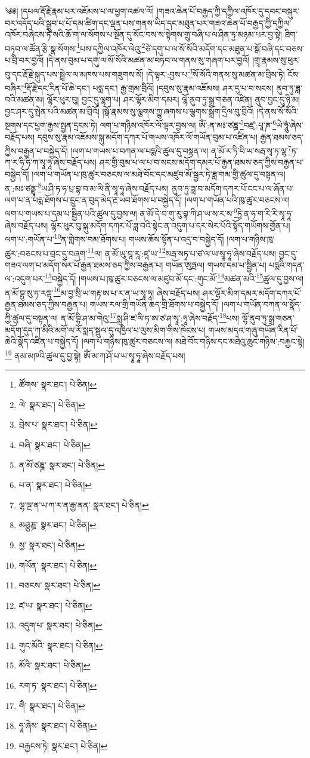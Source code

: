 \setcounter{footnote}{0} 
༄༅། །དཔལ་རྡོ་རྗེ་རྣམ་པར་འཇོམས་པ་ལ་ཕྱག་འཚལ་ལོ། །གཟའ་ཆེན་པོ་བརྒྱད་ཀྱི་དཀྱིལ་འཁོར་དུ་དབང་བསྐུར་བར་འདོད་པའི་སྒྲུབ་པ་པོ་དམ་ཚིག་དང་ལྡན་པས་གནས་ཡིད་དང་མཐུན་པར་གཟའ་ཆེན་པོ་བརྒྱད་ཀྱི་དཀྱིལ་འཁོར་བཞེངས་ཏེ་སའི་ཆོ་ག་ལ་སོགས་པ་སྔོན་དུ་སོང་བས་ས་སྟེགས་གྲུ་བཞི་པ་ལ་ཤིན་ཏུ་མཉམ་པར་བྱ་སྟེ། ཐིག་བཏབ་ལ་ཚོན་རྩི་སྣ་སོགས་\footnote{ཚོགས་  སྣར་ཐང་།  པེ་ཅིན། }པས་དཀྱིལ་འཁོར་ལེའུ་\footnote{ལེ་  སྣར་ཐང་།  པེ་ཅིན། }ཙེ་དགུ་པ་ལ་སོ་སོའི་མདོག་དང་མཐུན་པ་སྒོ་བཞི་དང་བཅས་པ་བྲི་བར་བྱའོ། །དེ་ནས་བུམ་པ་དགུ་ལ་སོ་སོའི་མཚན་མ་བཏབ་ལ་གནས་སུ་གཞག་པར་བྱའོ། །གྲྭ་རྣམས་སུ་ཕུར་བུ་དང་རྡོ་རྗེ་སྐུད་པས་སྦྲེལ་ལ་མཁས་པས་གཟུགས་སོ། །དེ་ལྟར་:བྱས་པ་\footnote{བྲེས་པ་  སྣར་ཐང་།  པེ་ཅིན། }སོ་སོའི་གནས་སུ་མཚན་མ་བྲིས་ཏེ། ངོས་བཞིར་\footnote{བཞི་  སྣར་ཐང་།  པེ་ཅིན། }རྡོ་རྗེ་དང་རིན་པོ་ཆེ་དང་། པདྨ་དང་། རྒྱ་གྲམ་བྲིའོ། །དབུས་སུ་རྣམ་འཇོམས། ཤར་དུ་པ་བ་སངས། ནུབ་ཏུ་ཟླ་བའི་མཚན་མ། ལྷོར་ཕུར་བུ། བྱང་དུ་ལྷག་པ། ཤར་ལྷོར་མིག་དམར། ལྷོ་ནུབ་ཏུ་སྒྲ་གཅན་འཛིན། ནུབ་བྱང་དུ་ཉི་མ། བྱང་ཤར་དུ་སྤེན་པའི་མཚན་མ་བྲིའོ། །སྒོ་རྣམས་སུ་ལྕགས་ཀྱུ་ཞགས་པ་ལྕགས་སྒྲོག་དྲིལ་བུ་བྲིའོ། །དེ་ནས་སོ་སོའི་སྔགས་དང་ཕྱག་རྒྱས་སྤྱན་དྲངས་ཏེ། ལག་པ་གཉིས་འཁོར་ལོ་ལྟར་བྱས་ལ། ཨོཾ་:ན་མཿ་ཙཎྜ་\footnote{ན་མོ་ཙཎྜ་  སྣར་ཐང་།  པེ་ཅིན། }བཛྲ་:པཱ་ཎ་\footnote{པ་ན་  སྣར་ཐང་།  པེ་ཅིན། }ཡེ་ཧཱུཾ་ཞེས་བརྗོད་པས། དབུས་སུ་རྣམ་འཇོམས་སྐུ་མདོག་དཀར་པོ་གཡས་འཁོར་ལོ་གཡོན་བུམ་པ་འཛིན་པ། རྒྱན་ཐམས་ཅད་ཀྱིས་བརྒྱན་པ་བསྐྱེད་དོ། །ལག་པ་གཡས་པ་བཀན་ལ་པདྨའི་ཚུལ་དུ་བསྟན་ལ། ན་མོ་ར་ཏི་བི་ཡ་སརྦ་སྭ་ཏ་ལྷ་\footnote{ལྷ་ལྔ་ན་ཡ་ཀ་ར་ན་རྒྱ་ནན་  སྣར་ཐང་།  པེ་ཅིན། }ཏ་ཀ་ར་ཧི་ཧི་ཀ་སྭཱ་ཧཱ་ཞེས་བརྗོད་པས། ཤར་གྱི་བུམ་པ་ལ་པ་བ་སངས་མདོག་དམར་པོ་རྒྱན་ཐམས་ཅད་ཀྱིས་བརྒྱན་པ་བསྐྱེད་དོ། །ལག་པ་གཡོན་པ་ཁུ་ཚུར་བཅངས་ལ་མཐེ་བོང་དང་མཛུབ་མོ་སྦྱར་ཏེ་ཟླ་གམ་གྱི་ཚུལ་དུ་བསྟན་ལ། ན་:མཿ་ཙནྡྲཱ་\footnote{མཤྩཎྜ་  སྣར་ཐང་།  པེ་ཅིན། }ཡ་ཤི་ཏ་ཧ་པྲ་བྷ་བ་མ་ལི་ནི་སྭཱ་ཧཱ་ཞེས་བརྗོད་པས། ནུབ་ཏུ་ཟླ་བ་མདོག་དཀར་པོ་ངང་པ་ལ་ཞོན་པ་ལག་པ་ན་པདྨ་ཐོགས་པ་དྲུང་ན་བུད་མེད་རྔ་ཡབ་ཐོགས་པ་བསྐྱེད་དོ། །ལག་པ་གཡོན་པའི་ཁུ་ཚུར་བཅངས་ལ། ལག་པ་གཡས་པ་དམ་པ་སྦྱིན་པའི་ཚུལ་དུ་བྱས་ལ། ན་མོ་དེ་བ་གུ་རུ་བྷ་ཀི་ཤ་ཡ་ས་ར་ས་\footnote{སྱ་  སྣར་ཐང་།  པེ་ཅིན། }ཏྱེ་ན་ཧ་ག་རི་རི་སྭཱ་ཧཱ་ཞེས་བརྗོད་པས། ལྷོར་ཕུར་བུ་སྐུ་མདོག་དཀར་པོ་ཟླ་བའི་སྟེང་ན་འདུག་པ་དར་སེར་པོའི་སྟོད་གཡོགས་གྱོན་པ། ལག་པ་:གཡོན་པ་\footnote{གཡོན་  སྣར་ཐང་།  པེ་ཅིན། }ན་གླེགས་བམ་ཐོགས་པ། གཡས་ཆོས་སྟོན་པ་འདྲ་བ་བསྐྱེད་དོ། །ལག་པ་གཉིས་ཁུ་ཚུར་:བཅངས་པ་བྲང་དུ་བཞག་\footnote{བཅངས་  སྣར་ཐང་།  པེ་ཅིན། }ལ། ན་མོ་ཡུ་བཱ་རཱ་:ཛཱ་ཡ་\footnote{ཛ་ཡ་  སྣར་ཐང་།  པེ་ཅིན། }སརྦ་སཏྭ་པ་ཙ་ལ་ཡ་སྭཱ་ཧཱ་ཞེས་བརྗོད་པས། བྱང་དུ་གཟའ་ལག་པ་མདོག་སེར་པོ་རྒྱན་ཐམས་ཅད་ཀྱིས་བརྒྱན་པ། གཡོན་ཨུཏྤལ། གཡས་དམ་པ་སྦྱིན་པ། པདྨའི་གདན་ལ་:འདུག་པར་\footnote{འདུག་པ་  སྣར་ཐང་།  པེ་ཅིན། }བསྐྱེད་དོ། །གཡས་པ་ཁུ་ཚུར་བཅངས་ལ་མཛུབ་མོ་དང་:གུང་མོ་\footnote{གུང་མོའི་  སྣར་ཐང་།  པེ་ཅིན། }མཚན་མའི་\footnote{མོའི་  སྣར་ཐང་།  པེ་ཅིན། }ཚུལ་དུ་བྱས་ལ། ན་མོ་བྷུ་སུ་ཏ་རཀྟ་\footnote{རག་ཏ་  སྣར་ཐང་།  པེ་ཅིན། }མ་བྱ་སྲི་ཡ་གརྟ་ཨ་པ་ར་ན་ཡ་སྭཱ་ཧཱ། ཞེས་བརྗོད་པས། ཤར་ལྷོར་མིག་དམར་མདོག་དཀར་པོ་རྒྱན་ཐམས་ཅད་ཀྱིས་བརྒྱན་པ། གཡས་རལ་གྲི་གཡོན་ཆད་གྲི་ཐོགས་པ་བསྐྱེད་དོ། །ལག་པ་གཡོན་བཀན་ལ་སྣོད་ཀྱི་ཚུལ་དུ་བསྟན་ལ། ན་མོ་བྷི་ཤ་མ་གེའུ་\footnote{གཻ་  སྣར་ཐང་།  པེ་ཅིན། }སྨྲ་ཤི་ཛ་ལི་ཏ་ཨ་ཙ་ཤ་སྭཱ་:ཧཱ་ཞེས་བརྗོད་\footnote{ཧཱ་ཞེས་  སྣར་ཐང་།  པེ་ཅིན། }པས། ལྷོ་ནུབ་ཏུ་སྒྲ་གཅན་མདོག་དུད་ཀ་མིའི་མགོ་ལ་རོ་སྨད་སྦྲུལ་དུ་འཁྱིལ་པ་ལུས་མིག་གིས་ཁེངས་པ། གཡས་མདའ་གཞུ་གཡོན་རིན་པོ་ཆེའི་སྣོད་འཛིན་པ་བསྐྱེད་དོ། །ལག་པ་གཉིས་ཁུ་ཚུར་བཅངས་ལ། མཐེ་བོང་གཉིས་དང་མཐེའུ་ཆུང་གཉིས་:བརྐྱང་སྟེ།\footnote{བརྐྱངས་ཏེ།  སྣར་ཐང་།  པེ་ཅིན། } ནམ་མཁའི་ཚུལ་དུ་བྱ་སྟེ། ཨོཾ་མ་ཀ་ཤོ་པ་ཡ་སྭཱ་ཧཱ་ཞེས་བརྗོད་པས། 